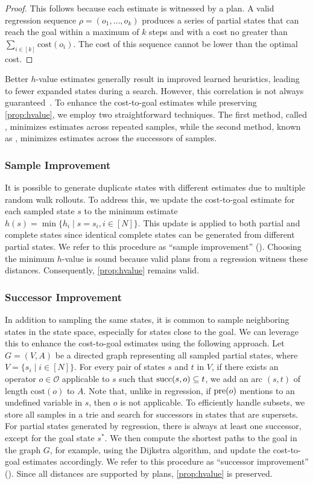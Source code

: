 \documentclass[ppgc,diss,english]{iiufrgs}
\begin{document}
\begin{proof}
This follows because each estimate is witnessed by a plan.
A valid regression sequence $\rho=(o_1,\ldots,o_k)$ produces a series of partial states that can reach the goal within a maximum of $k$ steps and with a cost no greater than $\sum_{i\in[k]}\text{cost}(o_i)$. The cost of this sequence cannot be lower than the optimal cost.
\end{proof}

Better $h$-value estimates generally result in improved learned heuristics, leading to fewer expanded states during a search. However, this correlation is not always guaranteed~\cite{Holte/2010}. To enhance the cost-to-goal estimates while preserving \cref{prop:hvalue}, we employ two straightforward techniques. The first method, called \sai, minimizes estimates across repeated samples, while the second method, known as \sui, minimizes estimates across the successors of samples.


\subsubsection{Sample Improvement}
It is possible to generate duplicate states with different estimates due to multiple random walk rollouts. To address this, we update the cost-to-goal estimate for each sampled state $s$ to the minimum estimate $h(s) = \min\{h_i \mid s=s_i, i\in[N]\}$. This update is applied to both partial and complete states since identical complete states can be generated from different partial states. We refer to this procedure as ``sample improvement'' (\sai). Choosing the minimum $h$-value is sound because valid plans from a regression witness these distances. Consequently, \cref{prop:hvalue} remains valid.

\subsubsection{Successor Improvement}
In addition to sampling the same states, it is common to sample neighboring states in the state space, especially for states close to the goal. We can leverage this to enhance the cost-to-goal estimates using the following approach. Let $G=(V,A)$ be a directed graph representing all sampled partial states, where~$V=\{s_i\mid i\in[N]\}$. For every pair of states $s$ and $t$ in $V$, if there exists an operator $o\in\mathcal{O}$ applicable to $s$ such that $\operatorname{succ}(s,o)\subseteq t$, we add an arc $(s,t)$ of length $\text{cost}(o)$ to $A$. Note that, unlike in regression, if $\operatorname{pre}(o)$ mentions to an undefined variable in $s$, then $o$ is not applicable. To efficiently handle subsets, we store all samples in a trie and search for successors in states that are supersets. For partial states generated by regression, there is always at least one successor, except for the goal state $s^*$. We then compute the shortest paths to the goal in the graph $G$, for example, using the Dijkstra algorithm, and update the cost-to-goal estimates accordingly. We refer to this procedure as ``successor improvement'' (\sui). Since all distances are supported by plans, \cref{prop:hvalue} is preserved.
\end{document}
